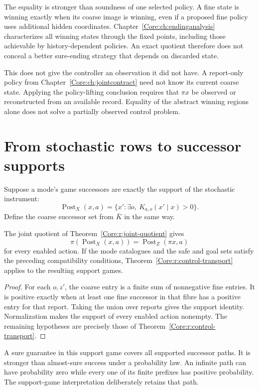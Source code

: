 The equality is stronger than soundness of one selected policy. A fine state is winning exactly when its coarse image is winning, even if a proposed fine policy uses additional hidden coordinates. Chapter~\ref{Core:ch:endinganalysis} characterizes all winning states through the fixed points, including those achievable by history-dependent policies. An exact quotient therefore does not conceal a better sure-ending strategy that depends on discarded state.

This does not give the controller an observation it did not have. A report-only policy from Chapter~\ref{Core:ch:jointcontract} need not know its current coarse state. Applying the policy-lifting conclusion requires that $\pi x$ be observed or reconstructed from an available record. Equality of the abstract winning regions alone does not solve a partially observed control problem.

\section{From stochastic rows to successor supports}
Suppose a mode's game successors are exactly the support of the stochastic instrument:
\[
 \operatorname{Post}_X(x,a)
 =\{x':\exists o,\ K_{a,o}(x'\mid x)>0\}.
\]
Define the coarse successor set from $\bar K$ in the same way.

\begin{Corecorollary}\label{Core:r:stochastic-support-game}
The joint quotient of Theorem~\ref{Core:r:joint-quotient} gives
\[
 \pi(\operatorname{Post}_X(x,a))=\operatorname{Post}_Z(\pi x,a)
\]
for every enabled action. If the mode catalogues and the safe and goal sets satisfy the preceding compatibility conditions, Theorem~\ref{Core:r:control-transport} applies to the resulting support games.
\end{Corecorollary}
\begin{proof}
For each $o,z'$, the coarse entry is a finite sum of nonnegative fine entries. It is positive exactly when at least one fine successor in that fibre has a positive entry for that report. Taking the union over reports gives the support identity. Normalization makes the support of every enabled action nonempty. The remaining hypotheses are precisely those of Theorem~\ref{Core:r:control-transport}.
\end{proof}

A sure guarantee in this support game covers all supported successor paths. It is stronger than almost-sure success under a probability law. An infinite path can have probability zero while every one of its finite prefixes has positive probability. The support-game interpretation deliberately retains that path.

